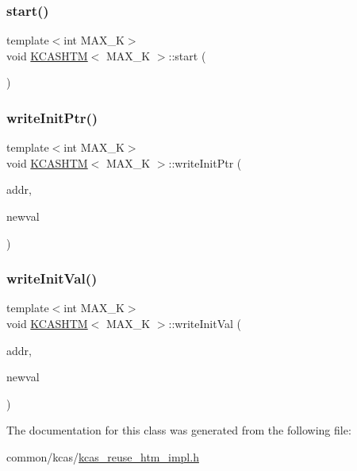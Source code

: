 \mbox{\label{classKCASHTM_a8788b509924018d6fc982e5d553b24d8}} 
\subsubsection{\texorpdfstring{start()}{start()}}
{\footnotesize\ttfamily template$<$int M\+A\+X\+\_\+K$>$ \\
void \hyperlink{classKCASHTM}{K\+C\+A\+S\+H\+TM}$<$ M\+A\+X\+\_\+K $>$\+::start (\begin{DoxyParamCaption}{ }\end{DoxyParamCaption})}

\mbox{\label{classKCASHTM_a1cc8f307886591c9fe769cb283d14226}} 
\subsubsection{\texorpdfstring{write\+Init\+Ptr()}{writeInitPtr()}}
{\footnotesize\ttfamily template$<$int M\+A\+X\+\_\+K$>$ \\
void \hyperlink{classKCASHTM}{K\+C\+A\+S\+H\+TM}$<$ M\+A\+X\+\_\+K $>$\+::write\+Init\+Ptr (\begin{DoxyParamCaption}\item[{\hyperlink{rq__unsafe_8h_ad45142aaf2ff20a036dc6242b8483e9c}{casword\+\_\+t} volatile $\ast$}]{addr,  }\item[{\hyperlink{rq__unsafe_8h_ad45142aaf2ff20a036dc6242b8483e9c}{casword\+\_\+t} const}]{newval }\end{DoxyParamCaption})}

\mbox{\label{classKCASHTM_ac3dd909b203532fd9d24981a3bd9ba5c}} 
\subsubsection{\texorpdfstring{write\+Init\+Val()}{writeInitVal()}}
{\footnotesize\ttfamily template$<$int M\+A\+X\+\_\+K$>$ \\
void \hyperlink{classKCASHTM}{K\+C\+A\+S\+H\+TM}$<$ M\+A\+X\+\_\+K $>$\+::write\+Init\+Val (\begin{DoxyParamCaption}\item[{\hyperlink{rq__unsafe_8h_ad45142aaf2ff20a036dc6242b8483e9c}{casword\+\_\+t} volatile $\ast$}]{addr,  }\item[{\hyperlink{rq__unsafe_8h_ad45142aaf2ff20a036dc6242b8483e9c}{casword\+\_\+t} const}]{newval }\end{DoxyParamCaption})}



The documentation for this class was generated from the following file\+:\begin{DoxyCompactItemize}
\item 
common/kcas/\hyperlink{kcas__reuse__htm__impl_8h}{kcas\+\_\+reuse\+\_\+htm\+\_\+impl.\+h}\end{DoxyCompactItemize}
